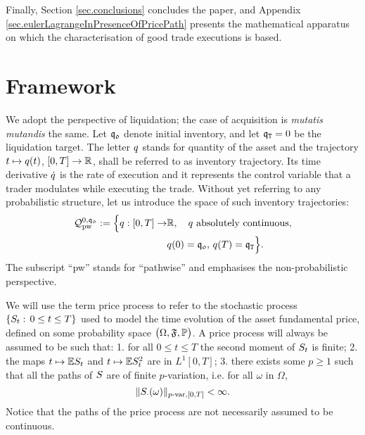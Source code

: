 \documentclass[10pt,a4paper]{article}
\begin{document}
Finally, Section \ref{sec.conclusions} concludes the paper, and  Appendix \ref{sec.eulerLagrangeInPresenceOfPricePath} presents the mathematical apparatus on which the characterisation of good trade executions is based. 




\section{Framework} \label{sec.framework}
We adopt the perspective of liquidation; the case of acquisition is \emph{mutatis mutandis} the same. Let $\initialInventory$ denote initial inventory, and let $\liquidationTarget=0$ be the liquidation target. The letter $\inventory$ stands for quantity of the asset and the trajectory $t\mapsto \inventory(t)$, $\timeWindow \rightarrow \R$, shall be referred to as inventory trajectory. Its time derivative $\dot{\inventory}$ is the rate of execution and it represents the control variable that a trader modulates while executing the trade. Without yet referring to any probabilistic structure, let us introduce the space of such inventory trajectories:
\begin{equation*}
\begin{split}
\spaceInventoryTrajectories^{0,\initialInventory}_{\text{pw}} := \Big\lbrace
\inventory:\timeWindow\rightarrow & \R,  \quad  \inventory \text{ absolutely continuous},\\ &  q(0) = \initialInventory, \, q(\timeHorizon) = \liquidationTarget\Big\rbrace.
\end{split}
\end{equation*}
The subscript ``pw'' stands for ``pathwise'' and emphasises the  non-probabilistic perspective. 

We will use the term price process to refer to the stochastic process $\lbrace \fundamentalPrice_t:\, 0\leq t\leq T\rbrace$ used to model the time  evolution of the asset fundamental price, defined on some probability space $\probabilitySpace$. A price process will always be assumed to be such that: 1. for all $0\leq t\leq T$ the second moment of $\fundamentalPrice_t$ is finite; 2. the maps $t\mapsto \Expectation\fundamentalPrice_t$ and $t\mapsto \Expectation\fundamentalPrice\squared_t$ are in $L^1[0,T]$; 3. there exists some $p\geq 1$ such that all the paths of $\fundamentalPrice$ are of finite $p$-variation, i.e. for all $\omega$ in $\Omega$, 
\begin{equation*}
\pvarNormInterval[\fundamentalPrice_{\cdot} (\omega)]{p}{\timeWindow} < \infty. 
\end{equation*}
Notice that the paths of the price process are not necessarily assumed to be continuous.
\end{document}
